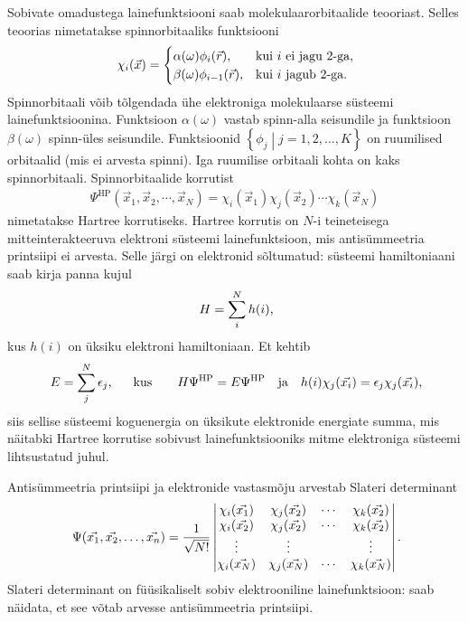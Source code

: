 \documentclass[12pt]{report}
\def\cparen#1{\left\{#1\right\}}
\begin{document}
Sobivate omadustega lainefunktsiooni saab molekulaarorbitaalide teooriast.
Selles teoorias nimetatakse spinnorbitaaliks funktsiooni
\begin{align}\label{eq:spinorb}
    \chi_i(\vec{x}) = \begin{cases}
        \alpha(\omega) \phi_i(\vec{r})\text{,} & \text{kui \(i\) ei jagu \(2\)-ga} \rlap{,}\\
        \beta(\omega) \phi_{i-1}(\vec{r})\text{,} & \text{kui \(i\) jagub \(2\)-ga} \rlap{.} \\
    \end{cases}
\end{align}
Spinnorbitaali võib tõlgendada ühe elektroniga molekulaarse süsteemi lainefunktsioonina.
Funktsioon \(\alpha(\omega)\) vastab spinn-alla seisundile ja funktsioon \(\beta(\omega)\) spinn-üles seisundile.
Funktsioonid \(\cparen{\phi_j \middle| j = 1,2, \ldots, K}\) on ruumilised orbitaalid (mis ei arvesta spinni).
Iga ruumilise orbitaali kohta on kaks spinn\-orbitaali.
Spinnorbitaalide korrutist
\begin{align}
    \Psi^\text{HP}(\vec{x}_1, \vec{x}_2, \cdots, \vec{x}_N) =
    \chi_i(\vec{x}_1) \chi_j(\vec{x}_2) \cdots \chi_k(\vec{x}_N)
\end{align}
nimetatakse Hartree korrutiseks.
Hartree korrutis on \(N\)-i teineteisega mitteinterakteeruva elektroni süsteemi lainefunktsioon, mis antisümmeetria printsiipi ei arvesta.
Selle järgi on elektronid sõltumatud: süsteemi hamiltoniaani saab kirja panna kujul
\begin{align}
    H = \sum_i^N h(i) \rlap{,}
\end{align}
kus \(h(i)\) on üksiku elektroni hamiltoniaan.
Et kehtib
\begin{align}
    E = \sum_j^N \epsilon_j \rlap{,}
    \qquad \text{kus} \qquad
    H \Psi^\text{HP} = E \Psi^\text{HP}
    \quad \text{ja} \quad
    h(i) \chi_j(\vec{x_i}) = \epsilon_j \chi_j(\vec{x_i}) \rlap{,}
\end{align}
siis sellise süsteemi koguenergia on üksikute elektronide energiate summa, mis näitabki Hartree korrutise sobivust lainefunktsiooniks mitme elektroniga süsteemi lihtsustatud juhul.

Antisümmeetria printsiipi ja elektronide vastasmõju arvestab Slateri determinant
\begin{align}\label{eq:slater}
    \Psi(\vec{x_1}, \vec{x_2}, \ldots, \vec{x_n}) =
    \frac{1}{\sqrt{N!}} \begin{vmatrix}
        \chi_i(\vec{x_1}) & \chi_j(\vec{x_2}) & \cdots & \chi_k(\vec{x_2}) \\
        \chi_i(\vec{x_2}) & \chi_j(\vec{x_2}) & \cdots & \chi_k(\vec{x_2}) \\
        \vdots & \vdots & & \vdots \\
        \chi_i(\vec{x_N}) & \chi_j(\vec{x_N}) & \cdots & \chi_k(\vec{x_N}) \\
    \end{vmatrix} \rlap{.}
\end{align}
Slateri determinant on füüsikaliselt sobiv elektrooniline lainefunktsioon: saab näidata, et see võtab arvesse antisümmeetria printsiipi.
\end{document}
